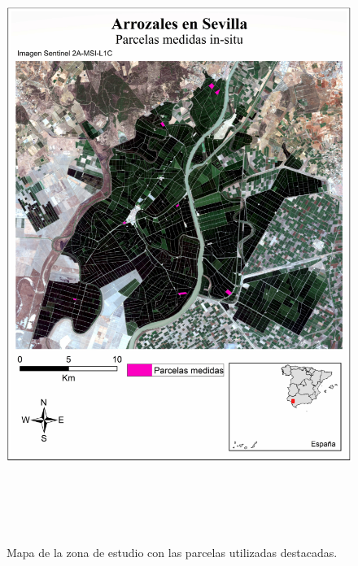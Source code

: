 \begin{figure}[H]
    \centering
    \includegraphics[height=20cm]{archivos/tfg/parcel_sat} %
    \caption{Mapa de la zona de estudio con las parcelas utilizadas destacadas. \cite{sentinelhub} }
    \label{fig:parcel}
\end{figure}
